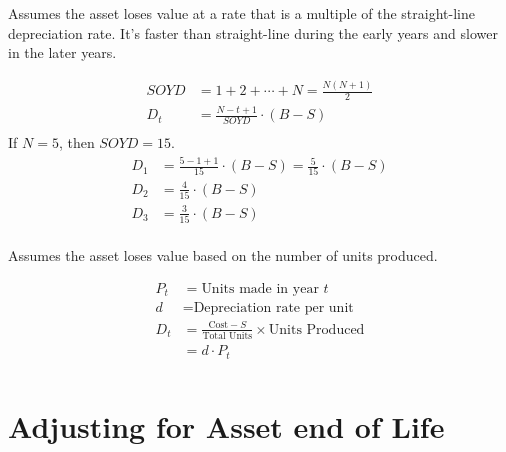 \begin{definition}
    Assumes the asset loses value at a rate that is a multiple of the straight-line depreciation rate. It's faster than straight-line during the early years and slower in the later years.
\end{definition}

\begin{theorem}
    \begin{align}
        SOYD & = 1 + 2 + \cdots + N = \frac{N(N+1)}{2} \\
        D_t  & = \frac{N-t+1}{SOYD} \cdot (B-S)        \\
    \end{align}
    If $N=5$, then $SOYD = 15$.
    \begin{align}
        D_1 & = \frac{5-1+1}{15} \cdot (B-S) = \frac{5}{15} \cdot (B-S) \\
        D_2 & = \frac{4}{15} \cdot (B-S)                                \\
        D_3 & = \frac{3}{15} \cdot (B-S)                                \\
    \end{align}
\end{theorem}

\begin{definition}
    Assumes the asset loses value based on the number of units produced.
\end{definition}

\begin{theorem}
    \begin{align}
        P_t & = \text{Units made in year }t                                           \\
        d   & = \text{Depreciation rate per unit}                                     \\
        D_t & = \frac{\text{Cost}-S}{\text{Total Units}} \times \text{Units Produced} \\
            & = d \cdot P_t                                                           \\
    \end{align}
\end{theorem}

\section{Adjusting for Asset end of Life}

